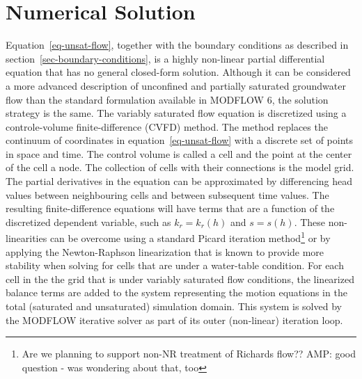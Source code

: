 \documentclass[fleqn]{article}
\begin{document}
\section{Numerical Solution}
Equation~\ref{eq-unsat-flow}, together with the boundary conditions as
described in section~\ref{sec-boundary-conditions}, is a highly non-linear
partial differential equation that has no general closed-form solution.
Although it can be considered a more advanced description of unconfined
and partially saturated groundwater flow than the standard formulation
available in MODFLOW 6, the solution strategy is the same. The variably
saturated flow equation is discretized using a controle-volume
finite-difference (CVFD) method. The method replaces the continuum of
coordinates in equation~\ref{eq-unsat-flow} with a discrete set of 
points in space and time. The control volume is called a cell and the
point at the center of the cell a node. The collection of cells with
their connections is the model grid. The partial derivatives in the
equation can be approximated by differencing head values between 
neighbouring cells and between subsequent time values. The resulting
finite-difference equations will have terms that are a function
of the discretized dependent variable, such as $k_r = k_r(h)$ and 
$s = s(h)$. These non-linearities can be overcome using a standard
Picard iteration method\footnote{Are we planning to support non-NR
  treatment of Richards flow?? AMP: good question - was wondering about that, too} or by applying the Newton-Raphson 
linearization that is known to provide more stability when solving for
cells that are under a water-table condition. For each cell in the
the grid that is under variably saturated flow conditions, the
linearized balance terms are added to the system representing the
motion equations in the total (saturated and unsaturated) simulation 
domain. This system is solved by the MODFLOW iterative solver as part
of its outer (non-linear) iteration loop.
\end{document}
